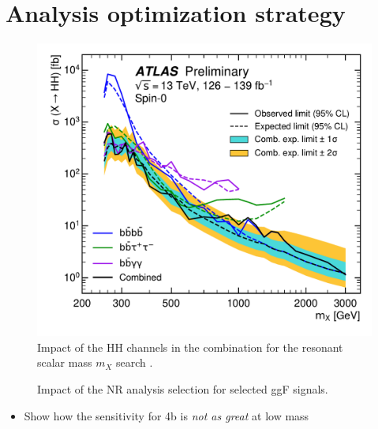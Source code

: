 \section{Analysis optimization strategy}

\begin{figure}
    \centering
    \includegraphics[width=0.9 \textwidth]{figures/ATLAS-CONF-2021-052/fig_08.pdf}
    \caption{Impact of the HH channels in the combination for the resonant scalar mass $m_X$ search \cite{ATLAS-CONF-2021-052}.}
    \label{fig:truth-hh-presel}
\end{figure}


\begin{figure}[h]
    \centering
    \caption{Impact of the NR analysis selection for selected ggF signals.}
    \label{fig:truth-hh-sel}
\end{figure}


\begin{itemize}
	\item{Show how the sensitivity for 4b is \emph{not as great} at low mass}
\end{itemize}
